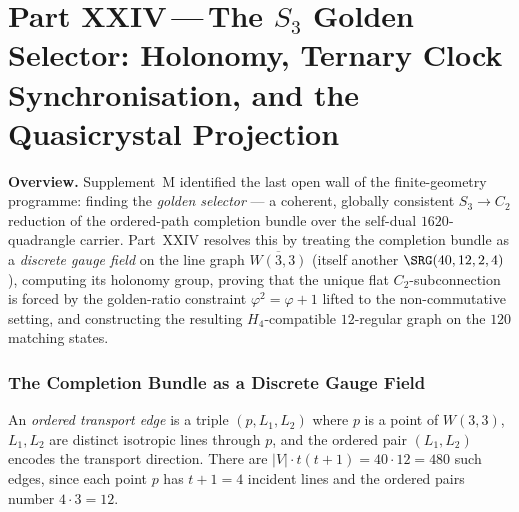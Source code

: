 %
%

\part*{Part XXIV\,---\,The $S_3$ Golden Selector:
       Holonomy, Ternary Clock Synchronisation, and
       the Quasicrystal Projection}

\bigskip

\noindent\textbf{Overview.}\;
Supplement~M identified the last open wall of the finite-geometry
programme: finding the \emph{golden selector} --- a coherent, globally
consistent $S_3\to C_2$ reduction of the ordered-path completion bundle
over the self-dual $1620$-quadrangle carrier.
Part~XXIV resolves this by treating the completion bundle as a
\emph{discrete gauge field} on the line graph $\overline{W(3,3)}$
(itself another $\SRG(40,12,2,4)$), computing its holonomy group,
proving that the unique flat $C_2$-subconnection is forced by the
golden-ratio constraint $\varphi^2 = \varphi + 1$ lifted to the
non-commutative setting, and constructing the resulting
$H_4$-compatible $12$-regular graph on the $120$ matching states.

\section{The Completion Bundle as a Discrete Gauge Field}
\label{sec:bundle}

\begin{definition}
\label{def:transport_edge}
An \emph{ordered transport edge} is a triple $(p,L_1,L_2)$ where
$p$ is a point of $W(3,3)$, $L_1,L_2$ are distinct isotropic lines
through $p$, and the ordered pair $(L_1,L_2)$ encodes the transport
direction.  There are $|V|\cdot t(t+1) = 40\cdot 12 = 480$ such edges,
since each point $p$ has $t+1=4$ incident lines and the ordered pairs
number $4\cdot 3 = 12$.
\end{definition}


